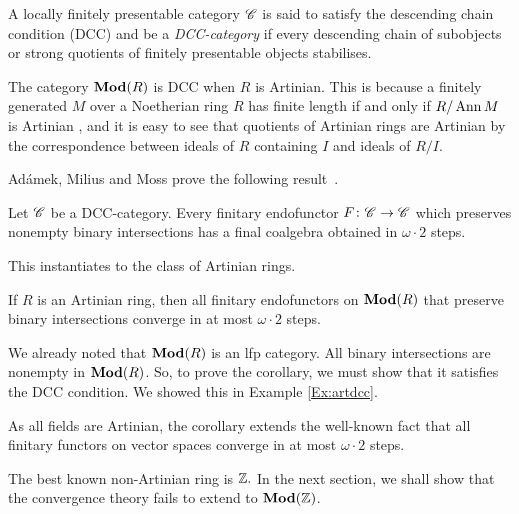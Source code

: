 \documentclass[runningheads]{llncs}
\begin{document}
\begin{definition}
A locally finitely presentable category $\mathscr{C}$ is said to satisfy the descending chain condition (DCC) and be a \emph{DCC-category} if every descending chain of subobjects or strong quotients of finitely presentable objects stabilises.
\end{definition}
\begin{example}
\label{Ex:artdcc}
The category $\operatorname{\mathbf{Mod}}(R)$  is DCC when $R$ is Artinian. This is because a finitely generated $M$ over a Noetherian ring $R$ has finite length if and only if $R/\operatorname{Ann} M$ is Artinian \cite[Corollary 2.17]{eisenbud95}, and it is easy to see that quotients of Artinian rings are Artinian by the correspondence between ideals of $R$ containing $I$ and ideals of $R/I$.
\end{example}
Ad\'amek, Milius and Moss prove the following result~\cite{AdamekEA25}.
\begin{theorem}
Let $\mathscr{C}$ be a DCC-category. Every finitary endofunctor $F \colon  \mathscr{C} \to \mathscr{C}$ which
preserves nonempty binary intersections has a final coalgebra obtained in  $\omega \cdot 2$  steps.
\end{theorem}
This instantiates to the class of Artinian rings.
\begin{corollaryE}
\label{cor:artin}
If $R$ is an Artinian ring, then all finitary endofunctors on $\operatorname{\mathbf{Mod}}(R)$ that preserve binary intersections converge in at most $\omega \cdot 2$ steps.
\end{corollaryE}
\begin{proofE}
We already noted that $\operatorname{\mathbf{Mod}}(R)$ is an lfp category. All binary intersections are nonempty in $\operatorname{\mathbf{Mod}}(R)$. So, to prove the corollary, we must show that it satisfies the DCC condition. We showed this in Example \ref{Ex:artdcc}.
\end{proofE}
\begin{remark}
As all fields are Artinian, the corollary extends the well-known fact that all finitary functors on vector spaces converge in at most $\omega \cdot 2$ steps.
\end{remark}
The best known non-Artinian ring is $\mathbb{Z}.$
 In the next section, we shall show that the convergence theory fails to extend to $\operatorname{\mathbf{Mod}}(\mathbb{Z})$.
\end{document}
